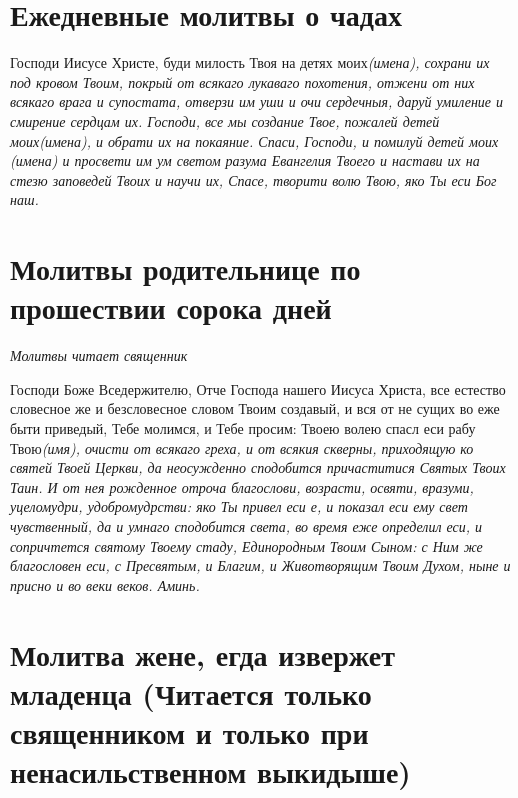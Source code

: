 \section{Ежедневные молитвы о чадах}
 


Господи Иисусе Христе, буди милость Твоя на детях моих\itshape  (имена)\normalfont{}, сохрани их под кровом Твоим, покрый от всякаго лукаваго похотения, отжени от них всякаго врага и супостата, отверзи им уши и очи сердечныя, даруй умиление и смирение сердцам их. Господи, все мы создание Твое, пожалей детей моих\itshape  (имена)\normalfont{}, и обрати их на покаяние. Спаси, Господи, и помилуй детей мои\itshape х (имена\normalfont{}) и просвети им ум светом разума Евангелия Твоего и настави их на стезю заповедей Твоих и научи их, Спасе, творити волю Твою, яко Ты еси Бог наш. 


\section{Молитвы родительнице по прошествии сорока дней}
 


\itshape Молитвы читает священник\normalfont{}

Господи Боже Вседержителю, Отче Господа нашего Иисуса Христа, все естество словесное же и безсловесное словом Твоим создавый, и вся от не сущих во еже быти приведый, Тебе молимся, и Тебе просим: Твоею волею спасл еси рабу Твою\itshape  (имя\normalfont{}), очисти от всякаго греха, и от всякия скверны, приходящую ко святей Твоей Церкви, да неосужденно сподобится причаститися Святых Твоих Таин. И от нея рожденное отроча благослови, возрасти, освяти, вразуми, уцеломудри, удобромудрстви: яко Ты привел еси е, и показал еси ему свет чувственный, да и умнаго сподобится света, во время еже определил еси, и сопричтется святому Твоему стаду, Единородным Твоим Сыном: с Ним же благословен еси, с Пресвятым, и Благим, и Животворящим Твоим Духом, ныне и присно и во веки веков. Аминь. 



\mychapterending


 

\section{Молитва жене, егда извержет младенца (Читается только священником и только при ненасильственном выкидыше)}
 


